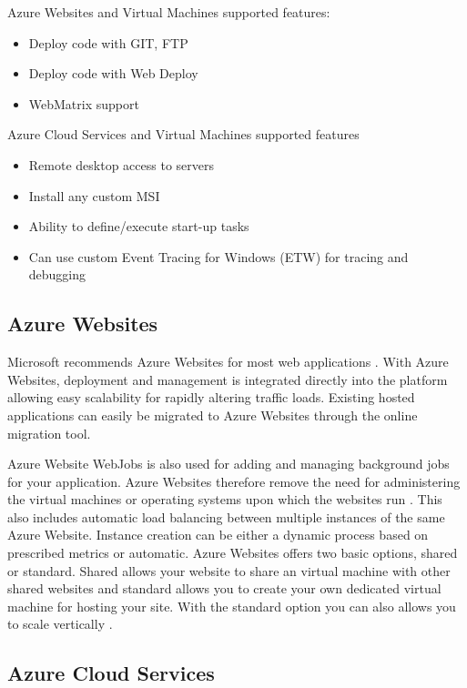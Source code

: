 Azure Websites and Virtual Machines supported features:
\begin{itemize}
\item Deploy code with GIT, FTP \checkmark
\item Deploy code with Web Deploy \checkmark
\item WebMatrix support
\end{itemize}
 
Azure Cloud Services and Virtual Machines supported features
\begin{itemize}
\item Remote desktop access to servers
\item Install any custom MSI
\item Ability to define/execute start-up tasks
\item Can use custom Event Tracing for Windows (ETW) for tracing and debugging
\end{itemize} 


\subsection{Azure Websites}

Microsoft recommends Azure Websites for most web applications \cite{Microsoft_Corporation2014-gg}. With Azure Websites, deployment and management is integrated directly into the platform allowing easy scalability for rapidly altering traffic loads. Existing hosted applications can easily be migrated to Azure Websites through the online migration tool.
 
Azure Website WebJobs is also used for adding and managing background jobs for your application. Azure Websites therefore remove the need for administering the virtual machines or operating systems upon which the websites run \cite{Microsoft_Corporation_undated-ej}. This also includes automatic load balancing between multiple instances of the same Azure Website. Instance creation can be either a dynamic process based on prescribed metrics or automatic. Azure Websites offers two basic options, shared or standard. Shared allows your website to share an virtual machine with other shared websites and standard allows you to create your own dedicated virtual machine for hosting your site. With the standard option you can also allows you to scale vertically \cite{Microsoft_Corporation_undated-ej}.

\subsection{Azure Cloud Services}

